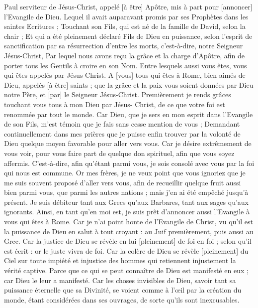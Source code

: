 \BFont
\begin{multicols}{2}
\VerseOne{}Paul serviteur de Jésus-Christ, appelé [à être] Apôtre, mis à part pour [annoncer] l'Evangile de Dieu.
Lequel il avait auparavant promis par ses Prophètes dans les saintes Ecritures ;
Touchant son Fils, qui est né de la famille de David, selon la chair ;
Et qui a été pleinement déclaré Fils de Dieu en puissance, selon l'esprit de sanctification par sa résurrection d'entre les morts, c'est-à-dire, notre Seigneur Jésus-Christ,
Par lequel nous avons reçu la grâce et la charge d'Apôtre, afin de porter tous les Gentils à croire en son Nom.
Entre lesquels aussi vous êtes, vous qui êtes appelés par Jésus-Christ.
A [vous] tous qui êtes à Rome, bien-aimés de Dieu, appelés [à être] saints ; que la grâce et la paix vous soient données par Dieu notre Père, et [par] le Seigneur Jésus-Christ.
Premièrement je rends grâces touchant vous tous à mon Dieu par Jésus- Christ, de ce que votre foi est renommée par tout le monde.
Car Dieu, que je sers en mon esprit dans l'Evangile de son Fils, m'est témoin que je fais sans cesse mention de vous ;
Demandant continuellement dans mes prières que je puisse enfin trouver par la volonté de Dieu quelque moyen favorable pour aller vers vous.
Car je désire extrêmement de vous voir, pour vous faire part de quelque don spirituel, afin que vous soyez affermis.
C'est-à-dire, afin qu'étant parmi vous, je sois consolé avec vous par la foi qui nous est commune.
Or mes frères, je ne veux point que vous ignoriez que je me suis souvent proposé d'aller vers vous, afin de recueillir quelque fruit aussi bien parmi vous, que parmi les autres nations ; mais j'en ai été empêché jusqu'à présent.
Je suis débiteur tant aux Grecs qu'aux Barbares, tant aux sages qu'aux ignorants.
Ainsi, en tant qu'en moi est, je suis prêt d'annoncer aussi l'Evangile à vous qui êtes à Rome.
Car je n'ai point honte de l'Evangile de Christ, vu qu'il est la puissance de Dieu en salut à tout croyant : au Juif premièrement, puis aussi au Grec.
Car la justice de Dieu se révèle en lui [pleinement] de foi en foi ; selon qu'il est écrit : or le juste vivra de foi.
Car la colère de Dieu se révèle [pleinement] du Ciel sur toute impiété et injustice des hommes qui retiennent injustement la vérité captive.
Parce que ce qui se peut connaître de Dieu est manifesté en eux ; car Dieu le leur a manifesté.
Car les choses invisibles de Dieu, savoir tant sa puissance éternelle que sa Divinité, se voient comme à l'œil par la création du monde, étant considérées dans ses ouvrages, de sorte qu'ils sont inexcusables.

\end{multicols}
